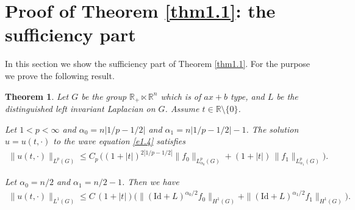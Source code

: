 \documentclass[a4paper,12pt]{amsart}
\numberwithin{equation}{section}
\newtheorem{theorem}{Theorem}
\theoremstyle{definition}
\theoremstyle{remark}
\numberwithin{theorem}{section}
\newcommand{\R}{\mathbb{R}}
\newcommand{\Id}{\mathrm{Id}}
\begin{document}


\section{Proof of Theorem \ref{thm1.1}: the sufficiency part}\label{sec5}
In this section we show the sufficiency part of Theorem \ref{thm1.1}. For the purpose we prove the following result.
\begin{theorem}\label{thm5.1}
Let $G$ be the group $\R_+\ltimes \R^n$ which is of $ax+b$ type, and $L$ be the distinguished left invariant Laplacian on $G$. Assume $t\in\R\setminus\{0\}$.
\begin{asparaenum}[\rm (i)]
\item
Let $1<p<\infty$ and $\alpha_0=n|1/p-1/2|$ and $\alpha_1=n|1/p-1/2|-1$. The solution $u=u(t,\cdot)$ to the wave equation \eqref{e1.4} satisfies
\begin{align*} 
\|u(t,\cdot)\|_{L^p(G)}\leq C_p\,\Big((1+|t|)^{2|1/p-1/2|}\|f_0\|_{L^p_{\alpha_0}(G)}+(1+|t|)\,\|f_1\|_{L^p_{\alpha_1}(G)}\Big).
\end{align*}
\item
Let $\alpha_0=n/2$ and $\alpha_1=n/2-1$. Then we have 
\begin{align*} 
\|u(t,\cdot)\|_{L^1(G)}\leq C\,(1+|t|)\Big(\|(\Id+L)^{\alpha_0/2}f_0\|_{H^1(G)}+\|(\Id+L)^{\alpha_1/2}f_1\|_{H^1(G)}\Big).
\end{align*}
\end{asparaenum}
\end{theorem}
\end{document}
